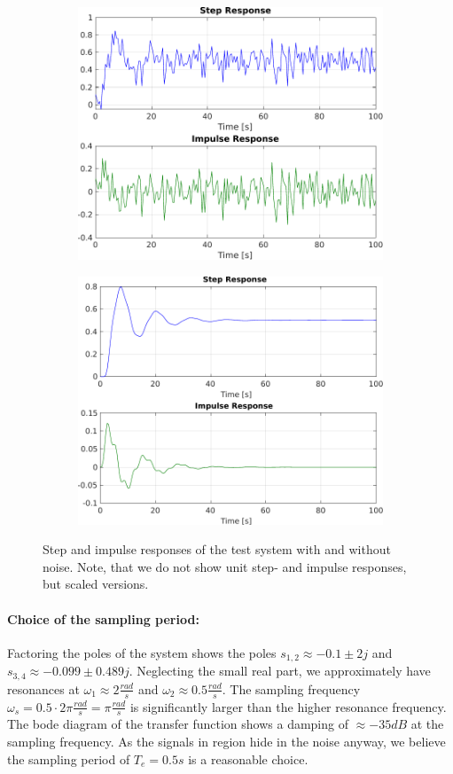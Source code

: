 \documentclass{scrartcl}
\begin{document}
\begin{figure}[h]
	\centering
	\begin{subfigure}{0.49\textwidth}
		\includegraphics[width=.8\textwidth]{figures/noisy_responses.pdf}
	\end{subfigure}
	\begin{subfigure}{0.49\textwidth}
		\includegraphics[width=.8\textwidth]{figures/noisefree.pdf}
	\end{subfigure}
	\caption{Step and impulse responses of the test system with and without noise. Note, that we do not show unit step- and impulse responses, but scaled versions.}\label{fig:responses}
\end{figure}

\paragraph{Choice of the sampling period: } 
Factoring the poles of the system shows the poles $s_{1,2} \approx -0.1 \pm 2j$ and $s_{3,4} \approx -0.099 \pm 0.489j$. 
Neglecting the small real part, we approximately have resonances at $\omega_1 \approx 2 \frac{rad}{s}$ and $\omega_2 \approx 0.5 \frac{rad}{s}$.
The sampling frequency $\omega_{s} = 0.5 \cdot 2\pi \frac{rad}{s} = \pi \frac{rad}{s}$ is significantly larger than the higher resonance frequency.
The bode diagram of the transfer function shows a damping of $\approx -35dB$ at the sampling frequency.
As the signals in region hide in the noise anyway, we believe the sampling period of $T_e = 0.5s$ is a reasonable choice.
\end{document}

